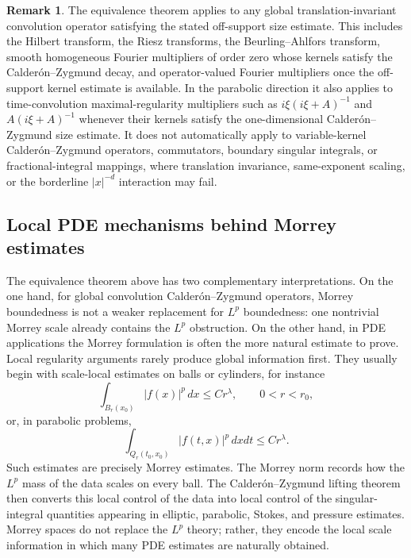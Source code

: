 \documentclass[11pt]{article}
\theoremstyle{definition}
\newtheorem{remark}[theorem]{Remark}
\begin{document}
		\begin{remark}\label{rem:operators-covered-equivalence}
		The equivalence theorem applies to any global translation-invariant convolution operator satisfying the stated off-support size estimate.  This includes the Hilbert transform, the Riesz transforms, the Beurling--Ahlfors transform, smooth homogeneous Fourier multipliers of order zero whose kernels satisfy the Calder\'on--Zygmund decay, and operator-valued Fourier multipliers once the off-support kernel estimate is available.  In the parabolic direction it also applies to time-convolution maximal-regularity multipliers such as $i\xi(i\xi+A)^{-1}$ and $A(i\xi+A)^{-1}$ whenever their kernels satisfy the one-dimensional Calder\'on--Zygmund size estimate.  It does not automatically apply to variable-kernel Calder\'on--Zygmund operators, commutators, boundary singular integrals, or fractional-integral mappings, where translation invariance, same-exponent scaling, or the borderline $|x|^{-d}$ interaction may fail.
	\end{remark}


\subsection{Local PDE mechanisms behind Morrey estimates}\label{subsec:local-pde-morrey-mechanisms}

The equivalence theorem above has two complementary interpretations.  On the one hand, for global convolution Calder\'on--Zygmund operators, Morrey boundedness is not a weaker replacement for $L^p$ boundedness: one nontrivial Morrey scale already contains the $L^p$ obstruction.  On the other hand, in PDE applications the Morrey formulation is often the more natural estimate to prove.  Local regularity arguments rarely produce global information first.  They usually begin with scale-local estimates on balls or cylinders, for instance
\[
        \int_{B_r(x_0)} |f(x)|^p\,dx\le C r^\lambda,
        \qquad 0<r<r_0,
\]
or, in parabolic problems,
\[
        \int_{Q_r(t_0,x_0)} |f(t,x)|^p\,dxdt\le C r^\lambda .
\]
Such estimates are precisely Morrey estimates.  The Morrey norm records how the $L^p$ mass of the data scales on every ball.  The Calder\'on--Zygmund lifting theorem then converts this local control of the data into local control of the singular-integral quantities appearing in elliptic, parabolic, Stokes, and pressure estimates.  Morrey spaces do not replace the $L^p$ theory; rather, they encode the local scale information in which many PDE estimates are naturally obtained.
\end{document}

